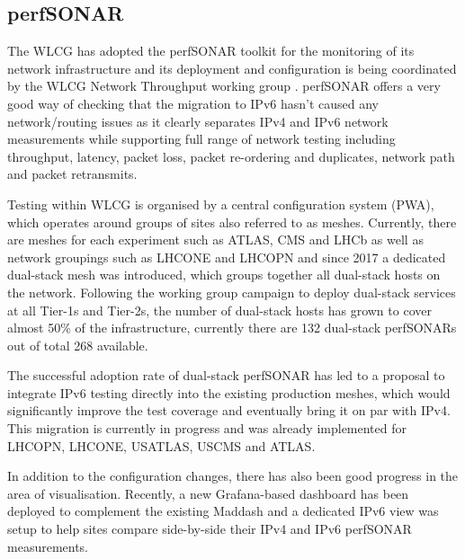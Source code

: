 \subsection{perfSONAR}
The WLCG has adopted the perfSONAR toolkit \cite{perfsonar} for the monitoring of its network infrastructure and its deployment and configuration is being coordinated by the WLCG Network Throughput working group \cite{wlcg-NTWG}.  perfSONAR offers a very good way of checking that the migration to IPv6 hasn't caused any network/routing issues as it clearly separates IPv4 and IPv6 network measurements while supporting full range of network testing including throughput, latency, packet loss, packet re-ordering and duplicates, network path and packet retransmits.

Testing within WLCG is organised by a central configuration system (PWA), which operates around groups of sites also referred to as meshes. Currently, there are meshes for each  experiment such as ATLAS, CMS and LHCb as well as network groupings such as LHCONE and LHCOPN and since 2017 a dedicated dual-stack mesh was introduced, which groups together all dual-stack hosts on the network. Following the working group campaign to deploy dual-stack services at all Tier-1s and Tier-2s, the number of dual-stack hosts has grown to cover almost 50\% of the infrastructure, currently there are 132 dual-stack perfSONARs out of total 268 available. 

The successful adoption rate of dual-stack perfSONAR has led to a proposal %
to integrate IPv6 testing directly into the existing production meshes, which would significantly improve the test coverage and eventually bring it on par with IPv4. This migration is currently in progress and was already implemented for LHCOPN, LHCONE, USATLAS, USCMS and ATLAS. 

In addition to the configuration changes, there has also been good progress in the area of visualisation. Recently, a new Grafana-based dashboard has been deployed to complement the existing Maddash \cite{psmad} and a dedicated IPv6 view was setup \cite{grafana-ipv6} to help sites compare side-by-side their IPv4 and IPv6 perfSONAR measurements. 

